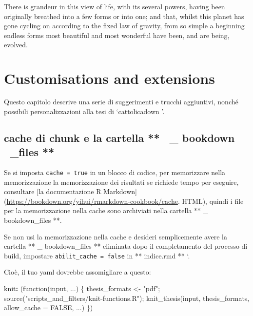 \documentclass[a4paper, 11pt, nobind]{templates/ociamthesis}
\newenvironment{Shaded}{\begin{snugshade}}{\end{snugshade}}
\newcommand{\AttributeTok}[1]{\textcolor[rgb]{0.77,0.63,0.00}{#1}}
\newcommand{\FunctionTok}[1]{\textcolor[rgb]{0.00,0.00,0.00}{#1}}
\newcommand{\KeywordTok}[1]{\textcolor[rgb]{0.13,0.29,0.53}{\textbf{#1}}}
\renewenvironment{Shaded}
{
  \vspace{10pt}%
  \begin{snugshade}%
}{%
  \end{snugshade}%
  \vspace{8pt}%
}
\begin{document}
\begin{savequote}
There is grandeur in this view of life, with its several powers, having
been originally breathed into a few forms or into one; and that, whilst
this planet has gone cycling on according to the fixed law of gravity,
from so simple a beginning endless forms most beautiful and most
wonderful have been, and are being, evolved.
\end{savequote}



\hypertarget{customisations-and-extensions}{%
\chapter{Customisations and extensions}\label{customisations-and-extensions}}

\minitoc 

\noindent Questo capitolo descrive una serie di suggerimenti e trucchi aggiuntivi, nonché possibili personalizzazioni alla tesi di `cattolicadown '.

\hypertarget{cache-di-chunk-e-la-cartella-_-bookdown-_files}{%
\section{cache di chunk e la cartella ** ~\_ bookdown ~\_files **}\label{cache-di-chunk-e-la-cartella-_-bookdown-_files}}

Se si imposta \texttt{cache\ =\ true} in un blocco di codice, per memorizzare nella memorizzazione la memorizzazione dei risultati se richiede tempo per eseguire, consultare {[}la documentazione R Markdown{]} (\url{https://bookdown.org/yihui/rmarkdown-cookbook/cache}. HTML), quindi i file per la memorizzazione nella cache sono archiviati nella cartella ** \_ bookdown\_files **.

Se non usi la memorizzazione nella cache e desideri semplicemente avere la cartella ** \_ bookdown\_files ** eliminata dopo il completamento del processo di build, impostare \texttt{abilit\_cache\ =\ false} in ** indice.rmd ** `.

Cioè, il tuo yaml dovrebbe assomigliare a questo:

\begin{Shaded}
\begin{Highlighting}[]
\FunctionTok{knit}\KeywordTok{:}\AttributeTok{ (function(input, ...) \{}
\AttributeTok{    thesis\_formats \textless{}{-} "pdf";}
\AttributeTok{    }
\AttributeTok{    source("scripts\_and\_filters/knit{-}functions.R");}
\AttributeTok{    knit\_thesis(input, thesis\_formats, allow\_cache = FALSE, ...)}
\AttributeTok{  \})}
\end{Highlighting}
\end{Shaded}
\end{document}
